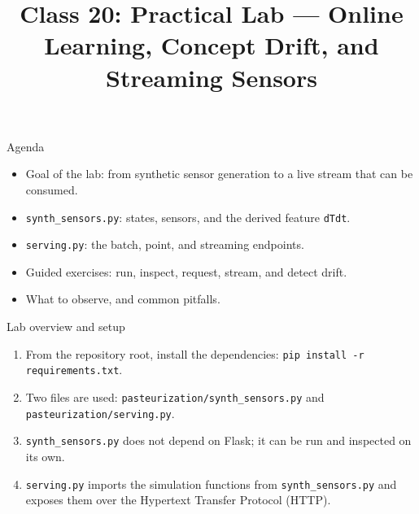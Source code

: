
\usepackage{amssymb}

\title{Class 20: Practical Lab --- Online Learning, Concept Drift, and Streaming Sensors}
\author{\coursename}
\date{}



\frame{\titlepage \coursefooter}

\begin{frame}{Agenda}
\begin{itemize}
\item Goal of the lab: from synthetic sensor generation to a live stream that can be consumed.
\item \texttt{synth\_sensors.py}: states, sensors, and the derived feature \texttt{dTdt}.
\item \texttt{serving.py}: the batch, point, and streaming endpoints.
\item Guided exercises: run, inspect, request, stream, and detect drift.
\item What to observe, and common pitfalls.
\end{itemize}
\coursefooter
\end{frame}

\begin{frame}{Lab overview and setup}
\begin{enumerate}
\item From the repository root, install the dependencies: \texttt{pip install -r requirements.txt}.
\item Two files are used: \texttt{pasteurization/synth\_sensors.py} and \texttt{pasteurization/serving.py}.
\item \texttt{synth\_sensors.py} does not depend on Flask; it can be run and inspected on its own.
\item \texttt{serving.py} imports the simulation functions from \texttt{synth\_sensors.py} and exposes them over the Hypertext Transfer Protocol (HTTP).
\end{enumerate}
\coursefooter
\end{frame}

